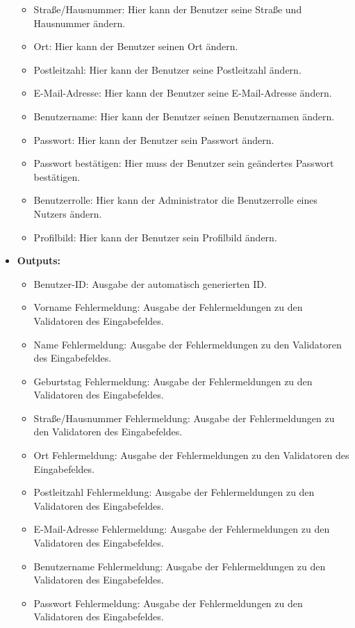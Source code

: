 \begin{itemize}
\begin{itemize}
								\item Straße/Hausnummer: Hier kann der Benutzer seine Straße und Hausnummer ändern.
								\item Ort: Hier kann der Benutzer seinen Ort ändern.
								\item Postleitzahl: Hier kann der Benutzer seine Postleitzahl ändern.
								\item E-Mail-Adresse: Hier kann der Benutzer seine E-Mail-Adresse ändern.
								\item Benutzername: Hier kann der Benutzer seinen Benutzernamen ändern.
								\item Passwort: Hier kann der Benutzer sein Passwort ändern.
								\item Passwort bestätigen: Hier muss der Benutzer sein geändertes Passwort bestätigen.
								\item Benutzerrolle: Hier kann der Administrator die Benutzerrolle eines Nutzers ändern.
								\item Profilbild: Hier kann der Benutzer sein Profilbild ändern.
							\end{itemize}
						\item \textbf{Outputs:}
							\begin{itemize}
								\item Benutzer-ID: Ausgabe der automatisch generierten ID.
								\item Vorname Fehlermeldung: Ausgabe der Fehlermeldungen zu den Validatoren des Eingabefeldes.
								\item Name Fehlermeldung: Ausgabe der Fehlermeldungen zu den Validatoren des Eingabefeldes.
								\item Geburtstag Fehlermeldung: Ausgabe der Fehlermeldungen zu den Validatoren des Eingabefeldes.
								\item Straße/Hausnummer Fehlermeldung: Ausgabe der Fehlermeldungen zu den Validatoren des Eingabefeldes.
								\item Ort Fehlermeldung: Ausgabe der Fehlermeldungen zu den Validatoren des Eingabefeldes.
								\item Postleitzahl Fehlermeldung: Ausgabe der Fehlermeldungen zu den Validatoren des Eingabefeldes.
								\item E-Mail-Adresse Fehlermeldung: Ausgabe der Fehlermeldungen zu den Validatoren des Eingabefeldes.
								\item Benutzername Fehlermeldung: Ausgabe der Fehlermeldungen zu den Validatoren des Eingabefeldes.
								\item Passwort Fehlermeldung: Ausgabe der Fehlermeldungen zu den Validatoren des Eingabefeldes.

\end{itemize}
\end{itemize}
